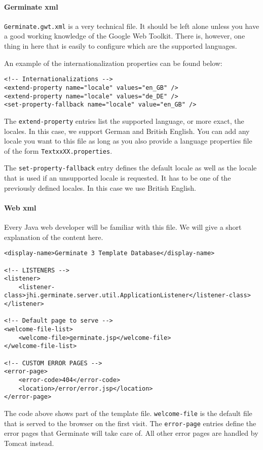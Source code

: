 \paragraph{Germinate xml}
\texttt{Germinate.gwt.xml} is a very technical file. It should be left alone unless you have a good working knowledge of the Google Web Toolkit. There is, however, one thing in here that is easily to configure which are the supported languages.

An example of the internationalization properties can be found below:
\begin{lstlisting}[style=Xml]
<!-- Internationalizations -->
<extend-property name="locale" values="en_GB" />
<extend-property name="locale" values="de_DE" />
<set-property-fallback name="locale" value="en_GB" />
\end{lstlisting}
\noindent
The \texttt{extend-property} entries list the supported language, or more exact, the locales. In this case, we support German and British English. You can add any locale you want to this file as long as you also provide a language properties file of the form \texttt{Text\textunderscore xx\textunderscore XX.properties}.

The \texttt{set-property-fallback} entry defines the default locale as well as the locale that is used if an unsupported locale is requested. It has to be one of the previously defined locales. In this case we use British English.

\paragraph{Web xml}
Every Java web developer will be familiar with this file. We will give a short explanation of the content here.
\begin{lstlisting}[style=Xml]
<display-name>Germinate 3 Template Database</display-name>

<!-- LISTENERS -->
<listener>
	<listener-class>jhi.germinate.server.util.ApplicationListener</listener-class>
</listener>

<!-- Default page to serve -->
<welcome-file-list>
	<welcome-file>germinate.jsp</welcome-file>
</welcome-file-list>

<!-- CUSTOM ERROR PAGES -->
<error-page>
    <error-code>404</error-code>
    <location>/error/error.jsp</location>
</error-page>
\end{lstlisting}
\noindent
The code above shows part of the template file. \texttt{welcome-file} is the default file that is served to the browser on the first visit. The \texttt{error-page} entries define the error pages that Germinate will take care of. All other error pages are handled by Tomcat instead.


